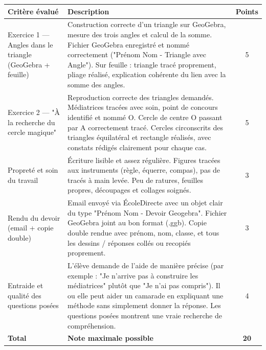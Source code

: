 \documentclass[answers]{exam}
\begin{document}
{
  \setlength{\LTright}{0pt}    %

\centering
\begin{longtable}{|L{0.3\textwidth}|L{0.7\textwidth}|c|}
\hline
{}
\textbf{Critère évalué} & \textbf{Description} & \textbf{Points} \\[2pt]
\hline

  Exercice 1 — Angles dans le triangle (GeoGebra + feuille)
  & Construction correcte d'un triangle sur GeoGebra, mesure des trois angles et calcul de la somme.  
  Fichier GeoGebra enregistré et nommé correctement ("Prénom Nom - Triangle avec Angle").  
  Sur feuille : triangle tracé proprement, pliage réalisé, explication cohérente du lien avec la somme des angles.
  & 5 \\
\hline

  Exercice 2 — "À la recherche du cercle magique"
  & Reproduction correcte des triangles demandés.  
  Médiatrices tracées avec soin, point de concours identifié et nommé O.  
  Cercle de centre O passant par A correctement tracé.  
  Cercles circonscrits des triangles équilatéral et rectangle réalisés, avec constats rédigés clairement pour chaque cas.
  & 5 \\
\hline

  Propreté et soin du travail
  & Écriture lisible et assez régulière.  
  Figures tracées aux instruments (règle, équerre, compas), pas de tracés à main levée.  
  Peu de ratures, feuilles propres, découpages et collages soignés.
  & 3 \\
\hline

  Rendu du devoir (email + copie double)
  & Email envoyé via ÉcoleDirecte avec un objet clair du type "Prénom Nom - Devoir Geogebra".  
  Fichier GeoGebra joint au bon format (.ggb).  
  Copie double rendue avec prénom, nom, classe, et tous les dessins / réponses collés ou recopiés proprement.
  & 3 \\
\hline

  Entraide et qualité des questions posées
  & L'élève demande de l'aide de manière précise (par exemple : "Je n'arrive pas à construire les médiatrices" plutôt que "Je n'ai pas compris").  
  Il ou elle peut aider un camarade en expliquant une méthode sans simplement donner la réponse.  
  Les questions posées montrent une vraie recherche de compréhension.
  & 4 \\
\hline

 \textbf{Total} & \textbf{Note maximale possible} & \textbf{20} \\
\hline

\end{longtable}
}
\end{document}
